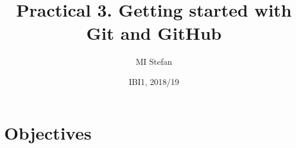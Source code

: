 \documentclass[pdflatex,a4paper]{article}
\title{Practical 3. Getting started with Git and GitHub}
\author{MI Stefan}
\date{IBI1, 2018/19}
\begin{document}
\maketitle

\section{Objectives}

\end{document}
